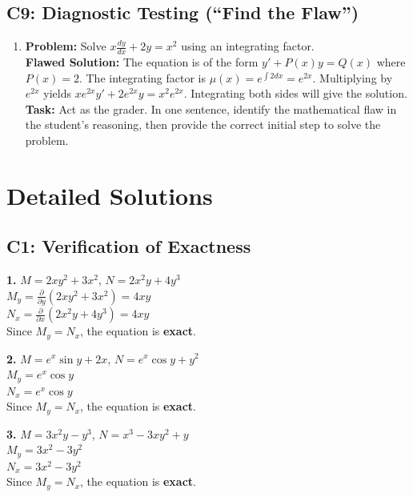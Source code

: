 \documentclass[11pt]{article}
\begin{document}
\subsection*{C9: Diagnostic Testing (``Find the Flaw'')}
\begin{enumerate}[resume]
    \item \textbf{Problem:} Solve $x \frac{dy}{dx} + 2y = x^2$ using an integrating factor. \\
    \textbf{Flawed Solution:} The equation is of the form $y' + P(x)y = Q(x)$ where $P(x) = 2$. The integrating factor is $\mu(x) = e^{\int 2 dx} = e^{2x}$. Multiplying by $e^{2x}$ yields $x e^{2x} y' + 2 e^{2x} y = x^2 e^{2x}$. Integrating both sides will give the solution. \\
    \textbf{Task:} Act as the grader. In one sentence, identify the mathematical flaw in the student's reasoning, then provide the correct initial step to solve the problem.
\end{enumerate}

\newpage
\section{Detailed Solutions}

\subsection*{C1: Verification of Exactness}

\textbf{1.} $M = 2xy^2 + 3x^2$, $N = 2x^2y + 4y^3$ \\
$M_y = \frac{\partial}{\partial y}(2xy^2 + 3x^2) = 4xy$ \\
$N_x = \frac{\partial}{\partial x}(2x^2y + 4y^3) = 4xy$ \\
Since $M_y = N_x$, the equation is \textbf{exact}.

\vspace{0.5cm}
\textbf{2.} $M = e^x \sin y + 2x$, $N = e^x \cos y + y^2$ \\
$M_y = e^x \cos y$ \\
$N_x = e^x \cos y$ \\
Since $M_y = N_x$, the equation is \textbf{exact}.

\vspace{0.5cm}
\textbf{3.} $M = 3x^2 y - y^3$, $N = x^3 - 3xy^2 + y$ \\
$M_y = 3x^2 - 3y^2$ \\
$N_x = 3x^2 - 3y^2$ \\
Since $M_y = N_x$, the equation is \textbf{exact}.
\end{document}
